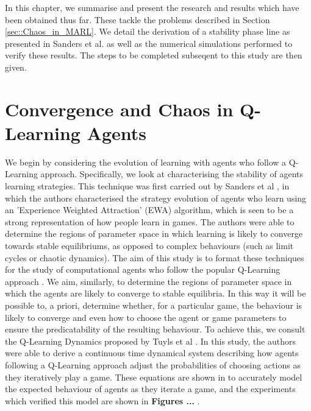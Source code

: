 \documentclass[.../main.tex]{subfiles}
\begin{document}
    In this chapter, we summarise and present the research and results which have been obtained thus
    far. These tackle the problems described in Section \ref{sec::Chaos_in_MARL}. We detail the
    derivation of a stability phase line as presented in Sanders et al. \cite{Sanders2018} as well
    as the numerical simulations performed to verify these results. The steps to be completed
    subseqent to this study are then given.

    \section{Convergence and Chaos in Q-Learning Agents} \label{sec::Chaos_in_Q-Learning}

    We begin by considering the evolution of learning with agents who follow a Q-Learning approach.
    Specifically, we look at characterising the stability of agents learning strategies. This
    technique was first carried out by Sanders et al \cite{Sanders}, in which the authors
    characterised the strategy evolution of agents who learn using an 'Experience Weighted
    Attraction' (EWA) algorithm, which is seen to be a strong representation of how people learn in
    games. The authors were able to determine the regions of parameter space in which learning is
    likely to converge towards stable equilibriums, as opposed to complex behaviours (such as limit
    cycles or chaotic dynamics). The aim of this study is to format these techniques for the study
    of computational agents who follow the popular Q-Learning approach \cite{SuttonBarto,Schwarz}.
    {}
    We aim, similarly, to determine the regions of parameter space in which the agents are likely to
    converge to stable equilibria. In this way it will be possible to, a priori, determine whether,
    for a particular game, the behaviour is likely to converge and even how to choose the agent or
    game parameters to ensure the predicatability of the resulting behaviour. To achieve this, we
    consult the Q-Learning Dynamics proposed by Tuyls et al \cite{TuylsDynamics}. In this study, the
    authors were able to derive a continuous time dynamical system describing how agents following a
    Q-Learning approach adjust the probabilities of choosing actions as they iteratively play a
    game. These equations are shown in \cite{TuylsDynamics} to accurately model the expected
    behaviour of agents as they iterate a game, and the experiments which verified this model are
    shown in \textbf{Figures ...} . 
\end{document}
